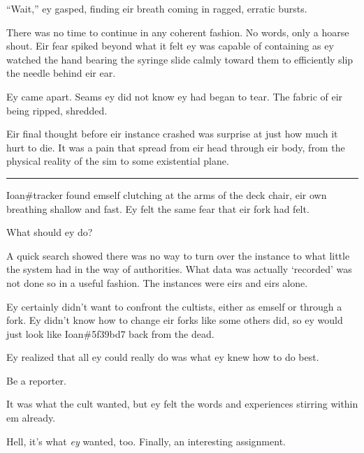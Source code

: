 ``Wait,'' ey gasped, finding eir breath coming in ragged, erratic bursts.

There was no time to continue in any coherent fashion. No words, only a hoarse shout. Eir fear spiked beyond what it felt ey was capable of containing as ey watched the hand bearing the syringe slide calmly toward them to efficiently slip the needle behind eir ear.

Ey came apart. Seams ey did not know ey had began to tear. The fabric of eir being ripped, shredded.

Eir final thought before eir instance crashed was surprise at just how much it hurt to die. It was a pain that spread from eir head through eir body, from the physical reality of the sim to some existential plane.

\begin{center}\rule{0.5\linewidth}{\linethickness}\end{center}

Ioan\#tracker found emself clutching at the arms of the deck chair, eir own breathing shallow and fast. Ey felt the same fear that eir fork had felt.

What should ey do?

A quick search showed there was no way to turn over the instance to what little the system had in the way of authorities. What data was actually `recorded' was not done so in a useful fashion. The instances were eirs and eirs alone.

Ey certainly didn't want to confront the cultists, either as emself or through a fork. Ey didn't know how to change eir forks like some others did, so ey would just look like Ioan\#5f39bd7 back from the dead.

Ey realized that all ey could really do was what ey knew how to do best.

Be a reporter.

It was what the cult wanted, but ey felt the words and experiences stirring within em already.

Hell, it's what \emph{ey} wanted, too. Finally, an interesting assignment.
